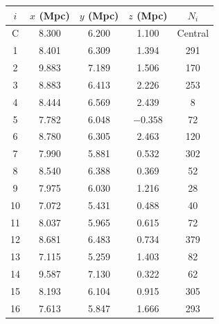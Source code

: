 \begin{center}
\begin{tabular}{ccccc}
$i$ & $x$ (Mpc) & $y$ (Mpc) & $z$ (Mpc) & $N_i$ \\
\hline
C  & 8.300 & 6.200 &  1.100 & Central \\
\hline
1  & 8.401 & 6.309 &  1.394 & 291 \\
2  & 9.883 & 7.189 &  1.506 & 170 \\
3  & 8.883 & 6.413 &  2.226 & 253 \\
4  & 8.444 & 6.569 &  2.439 & 8   \\
5  & 7.782 & 6.048 & $-0.358$ & 72  \\
6  & 8.780 & 6.305 &  2.463 & 120 \\
7  & 7.990 & 5.881 &  0.532 & 302 \\
8  & 8.540 & 6.388 &  0.369 & 52  \\
9  & 7.975 & 6.030 &  1.216 & 28  \\
10 & 7.072 & 5.431 &  0.488 & 40  \\
11 & 8.037 & 5.965 &  0.615 & 72  \\
12 & 8.681 & 6.483 &  0.734 & 379 \\
13 & 7.115 & 5.259 &  1.403 & 82  \\
14 & 9.587 & 7.130 &  0.322 & 62  \\
15 & 8.193 & 6.104 &  0.915 & 305 \\
16 & 7.613 & 5.847 &  1.666 & 293 \\
\end{tabular}
\end{center}

